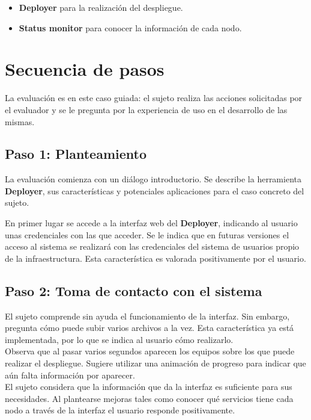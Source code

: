 \begin{itemize}
	\item \textbf{Deployer} para la realización del despliegue.
	\item \textbf{Status monitor} para conocer la información de cada nodo.
\end{itemize}

\section{Secuencia de pasos}

La evaluación es en este caso guiada: el sujeto realiza las acciones solicitadas por el evaluador y se le pregunta por la experiencia de uso en el desarrollo de las mismas.

\subsection{Paso 1: Planteamiento}

La evaluación comienza con un diálogo introductorio. Se describe la herramienta \textbf{Deployer}, sus características y potenciales aplicaciones para el caso concreto del sujeto.

En primer lugar se accede a la interfaz web del \textbf{Deployer}, indicando al usuario unas credenciales con las que acceder. Se le indica que en futuras versiones el acceso al sistema se realizará con las credenciales del sistema de usuarios propio de la infraestructura. Esta característica es valorada positivamente por el usuario.


\subsection{Paso 2: Toma de contacto con el sistema}

El sujeto comprende sin ayuda el funcionamiento de la interfaz. Sin embargo, pregunta cómo puede subir varios archivos a la vez. Esta característica ya está implementada, por lo que se indica al usuario cómo realizarlo.\\

Observa que al pasar varios segundos aparecen los equipos sobre los que puede realizar el despliegue. Sugiere utilizar una animación de progreso para indicar que aún falta información por aparecer.\\

El sujeto considera que la información que da la interfaz es suficiente para sus necesidades. Al plantearse mejoras tales como conocer qué servicios tiene cada nodo a través de la interfaz el usuario responde positivamente.\\

